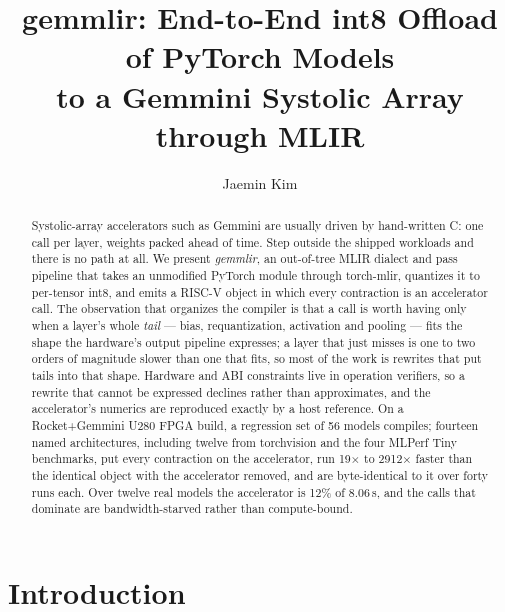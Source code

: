 \documentclass[runningheads]{llncs}
\begin{document}
%
\title{gemmlir: End-to-End int8 Offload of PyTorch Models\\
to a Gemmini Systolic Array through MLIR}
%
%
\author{Jaemin Kim}
%
%
%
\maketitle
%
\begin{abstract}
Systolic-array accelerators such as Gemmini are usually driven by hand-written C:
one call per layer, weights packed ahead of time. Step outside the shipped
workloads and there is no path at all. We present \emph{gemmlir}, an out-of-tree
MLIR dialect and pass pipeline that takes an unmodified PyTorch module through
torch-mlir, quantizes it to per-tensor int8, and emits a RISC-V object in which
every contraction is an accelerator call. The observation that organizes the
compiler is that a call is worth having only when a layer's whole \emph{tail} ---
bias, requantization, activation and pooling --- fits the shape the hardware's
output pipeline expresses; a layer that just misses is one to two orders of
magnitude slower than one that fits, so most of the work is rewrites that put
tails into that shape. Hardware and ABI constraints live in operation verifiers,
so a rewrite that cannot be expressed declines rather than approximates, and the
accelerator's numerics are reproduced exactly by a host reference. On a
Rocket+Gemmini U280 FPGA build, a regression set of 56 models compiles; fourteen
named architectures, including twelve from torchvision and the four MLPerf Tiny
benchmarks, put every contraction on the accelerator, run 19$\times$ to
2912$\times$ faster than the identical object with the accelerator removed, and
are byte-identical to it over forty runs each. Over twelve real models the accelerator is
12\% of 8.06\,s, and the calls that dominate are bandwidth-starved rather than
compute-bound.

\end{abstract}
%
\section{Introduction}
\end{document}
